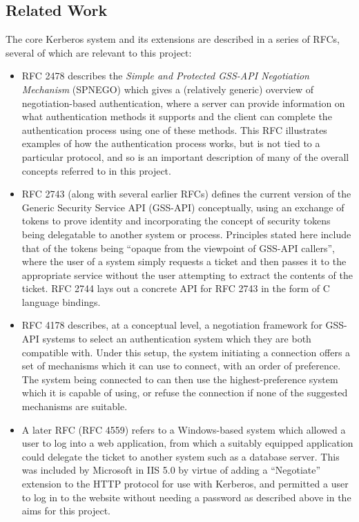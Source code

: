\documentclass{article}
\begin{document}
\subsection{Related Work}
The core Kerberos system and its extensions are described in a series of RFCs, several of which are relevant to this project:

\begin{itemize}
\item
  RFC 2478\cite{RFC2478} describes the \textit{Simple and Protected GSS-API Negotiation Mechanism} (SPNEGO) which gives a (relatively generic) overview of negotiation-based authentication, where a server can provide information on what authentication methods it supports and the client can complete the authentication process using one of these methods. This RFC illustrates examples of how the authentication process works, but is not tied to a particular protocol, and so is an important description of many of the overall concepts referred to in this project.
\item
  RFC 2743\cite{RFC2743} (along with several earlier RFCs) defines the current version of the Generic Security Service API (GSS-API) conceptually, using an exchange of tokens to prove identity and incorporating the concept of security tokens being delegatable to another system or process. Principles stated here include that of the tokens being ``opaque from the viewpoint of GSS-API callers'', where the user of a system simply requests a ticket and then passes it to the appropriate service without the user attempting to extract the contents of the ticket. RFC 2744\cite{RFC2744} lays out a concrete API for RFC 2743 in the form of C language bindings.
\item
  RFC 4178\cite{RFC4178} describes, at a conceptual level, a negotiation framework for GSS-API systems to select an authentication system which they are both compatible with. Under this setup, the system initiating a connection offers a set of mechanisms which it can use to connect, with an order of preference. The system being connected to can then use the highest-preference system which it is capable of using, or refuse the connection if none of the suggested mechanisms are suitable.
\item
  A later RFC (RFC 4559\cite{RFC4559}) refers to a Windows-based system which allowed a user to log into a web application, from which a suitably equipped application could delegate the ticket to another system such as a database server. This was included by Microsoft in IIS 5.0 by virtue of adding a ``Negotiate'' extension to the HTTP protocol for use with Kerberos, and permitted a user to log in to the website without needing a password as described above in the aims for this project.
\end{itemize}
\end{document}
